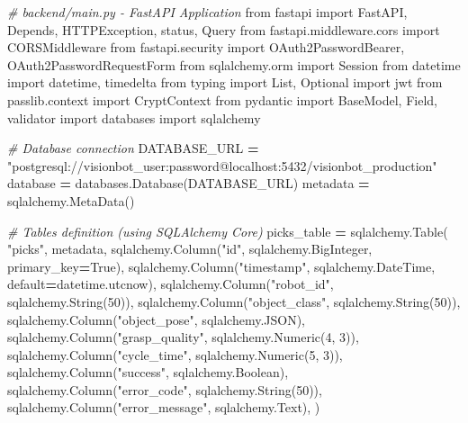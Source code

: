 \documentclass[
]{article}
\newenvironment{Shaded}{\begin{snugshade}}{\end{snugshade}}
\newcommand{\CommentTok}[1]{\textcolor[rgb]{0.56,0.35,0.01}{\textit{#1}}}
\newcommand{\DecValTok}[1]{\textcolor[rgb]{0.00,0.00,0.81}{#1}}
\newcommand{\ImportTok}[1]{#1}
\newcommand{\NormalTok}[1]{#1}
\newcommand{\OperatorTok}[1]{\textcolor[rgb]{0.81,0.36,0.00}{\textbf{#1}}}
\newcommand{\StringTok}[1]{\textcolor[rgb]{0.31,0.60,0.02}{#1}}
\newcommand{\VariableTok}[1]{\textcolor[rgb]{0.00,0.00,0.00}{#1}}
\begin{document}
\begin{Shaded}
\begin{Highlighting}[]
\CommentTok{\# backend/main.py {-} FastAPI Application}
\ImportTok{from}\NormalTok{ fastapi }\ImportTok{import}\NormalTok{ FastAPI, Depends, HTTPException, status, Query}
\ImportTok{from}\NormalTok{ fastapi.middleware.cors }\ImportTok{import}\NormalTok{ CORSMiddleware}
\ImportTok{from}\NormalTok{ fastapi.security }\ImportTok{import}\NormalTok{ OAuth2PasswordBearer, OAuth2PasswordRequestForm}
\ImportTok{from}\NormalTok{ sqlalchemy.orm }\ImportTok{import}\NormalTok{ Session}
\ImportTok{from}\NormalTok{ datetime }\ImportTok{import}\NormalTok{ datetime, timedelta}
\ImportTok{from}\NormalTok{ typing }\ImportTok{import}\NormalTok{ List, Optional}
\ImportTok{import}\NormalTok{ jwt}
\ImportTok{from}\NormalTok{ passlib.context }\ImportTok{import}\NormalTok{ CryptContext}
\ImportTok{from}\NormalTok{ pydantic }\ImportTok{import}\NormalTok{ BaseModel, Field, validator}
\ImportTok{import}\NormalTok{ databases}
\ImportTok{import}\NormalTok{ sqlalchemy}

\CommentTok{\# Database connection}
\NormalTok{DATABASE\_URL }\OperatorTok{=} \StringTok{"postgresql://visionbot\_user:password@localhost:5432/visionbot\_production"}
\NormalTok{database }\OperatorTok{=}\NormalTok{ databases.Database(DATABASE\_URL)}
\NormalTok{metadata }\OperatorTok{=}\NormalTok{ sqlalchemy.MetaData()}

\CommentTok{\# Tables definition (using SQLAlchemy Core)}
\NormalTok{picks\_table }\OperatorTok{=}\NormalTok{ sqlalchemy.Table(}
    \StringTok{"picks"}\NormalTok{,}
\NormalTok{    metadata,}
\NormalTok{    sqlalchemy.Column(}\StringTok{"id"}\NormalTok{, sqlalchemy.BigInteger, primary\_key}\OperatorTok{=}\VariableTok{True}\NormalTok{),}
\NormalTok{    sqlalchemy.Column(}\StringTok{"timestamp"}\NormalTok{, sqlalchemy.DateTime, default}\OperatorTok{=}\NormalTok{datetime.utcnow),}
\NormalTok{    sqlalchemy.Column(}\StringTok{"robot\_id"}\NormalTok{, sqlalchemy.String(}\DecValTok{50}\NormalTok{)),}
\NormalTok{    sqlalchemy.Column(}\StringTok{"object\_class"}\NormalTok{, sqlalchemy.String(}\DecValTok{50}\NormalTok{)),}
\NormalTok{    sqlalchemy.Column(}\StringTok{"object\_pose"}\NormalTok{, sqlalchemy.JSON),}
\NormalTok{    sqlalchemy.Column(}\StringTok{"grasp\_quality"}\NormalTok{, sqlalchemy.Numeric(}\DecValTok{4}\NormalTok{, }\DecValTok{3}\NormalTok{)),}
\NormalTok{    sqlalchemy.Column(}\StringTok{"cycle\_time"}\NormalTok{, sqlalchemy.Numeric(}\DecValTok{5}\NormalTok{, }\DecValTok{3}\NormalTok{)),}
\NormalTok{    sqlalchemy.Column(}\StringTok{"success"}\NormalTok{, sqlalchemy.Boolean),}
\NormalTok{    sqlalchemy.Column(}\StringTok{"error\_code"}\NormalTok{, sqlalchemy.String(}\DecValTok{50}\NormalTok{)),}
\NormalTok{    sqlalchemy.Column(}\StringTok{"error\_message"}\NormalTok{, sqlalchemy.Text),}
\NormalTok{)}


\end{Highlighting}
\end{Shaded}
\end{document}
